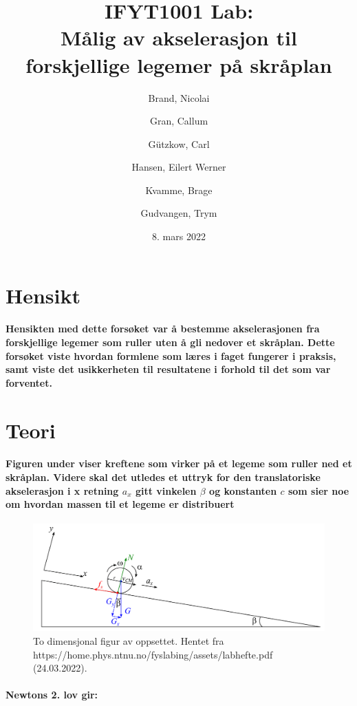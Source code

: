 \documentclass[12pt]{article}
\title{IFYT1001 Lab:\\ Målig av akselerasjon til forskjellige legemer på skråplan\newline}
\author{
  Brand, Nicolai\\
  \and
  Gran, Callum\\
  \and
  Gützkow, Carl\\
  \and
  Hansen, Eilert Werner\\
  \and
  Kvamme, Brage\\
  \and
  Gudvangen, Trym\\
}
\date{8. mars 2022}
\begin{document}
\maketitle
\smallskip
\section{Hensikt}

\paragraph{Hensikten med dette forsøket var å bestemme akselerasjonen fra forskjellige legemer som ruller uten å gli nedover et skråplan.
Dette forsøket viste hvordan formlene som læres i faget fungerer i praksis, samt viste det usikkerheten til resultatene i forhold til det som var forventet.}

\section{Teori}

\paragraph{Figuren under viser kreftene som virker på et legeme som ruller ned et skråplan. Videre skal det utledes et uttryk for den translatoriske akselerasjon i x retning $a_x$ gitt vinkelen $\beta$ og konstanten $c$ som sier noe om hvordan massen til et legeme er distribuert}

\newpage

\begin{figure}[htp]
    \centering
    \includegraphics[width=12cm]{fig_kok.png}
    \caption{To dimensjonal figur av oppsettet. Hentet fra https://home.phys.ntnu.no/fyslabing/assets/labhefte.pdf (24.03.2022).}
    \label{fig:oppsettfig}
\end{figure}

\paragraph{Newtons 2. lov gir:}
\end{document}

